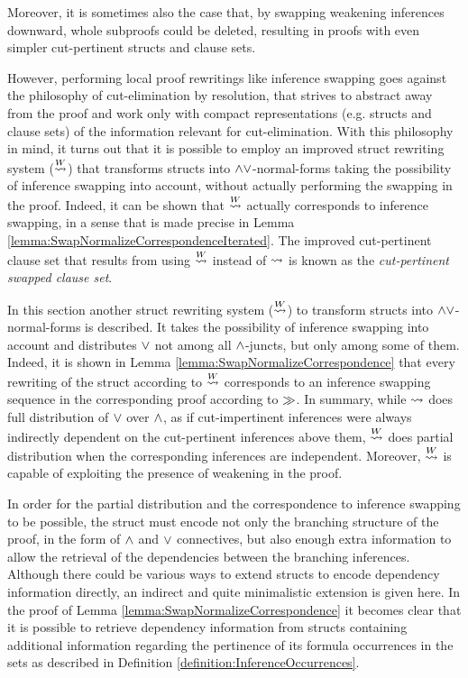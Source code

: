\documentclass{llncs}
\begin{document}
Moreover, it is sometimes also the case that, by swapping weakening inferences downward, whole subproofs could be deleted, resulting in proofs with even simpler cut-pertinent structs and clause sets.

However, performing local proof rewritings like inference swapping goes against the philosophy of cut-elimination by resolution, that strives to abstract away from the proof and work only with compact representations (e.g. structs and clause sets) of the information relevant for cut-elimination. With this philosophy in mind, it turns out that it is possible to employ an improved struct rewriting system ($\stackrel{W}{\leadsto}$) that transforms structs into $\wedge\vee$-normal-forms taking the possibility of inference swapping into account, without actually performing the swapping in the proof. Indeed, it can be shown that $\stackrel{W}{\leadsto}$ actually corresponds to inference swapping, in a sense that is made precise in Lemma \ref{lemma:SwapNormalizeCorrespondenceIterated}. The improved cut-pertinent clause set that results from using $\stackrel{W}{\leadsto}$ instead of $\leadsto$ is known as the \emph{cut-pertinent swapped clause set}.



In this section another struct rewriting system ($\stackrel{W}{\leadsto}$) to transform structs into $\wedge\vee$-normal-forms is described. It takes the possibility of inference swapping into account and distributes $\vee$ not among all $\wedge$-juncts, but only among some of them. Indeed, it is shown in Lemma \ref{lemma:SwapNormalizeCorrespondence} that every rewriting of the struct according to $\stackrel{W}{\leadsto}$ corresponds to an inference swapping sequence in the corresponding proof according to $\gg$. In summary, while $\leadsto$ does full distribution of $\vee$ over $\wedge$, as if cut-impertinent inferences were always indirectly dependent on the cut-pertinent inferences above them, $\stackrel{W}{\leadsto}$ does partial distribution when the corresponding inferences are independent. Moreover, $\stackrel{W}{\leadsto}$ is capable of exploiting the presence of weakening in the proof.

In order for the partial distribution and the correspondence to inference swapping to be possible, the struct must encode not only the branching structure of the proof, in the form of $\wedge$ and $\vee$ connectives, but also enough extra information to allow the retrieval of the dependencies between the branching inferences. Although there could be various ways to extend structs to encode dependency information directly, an indirect and quite minimalistic extension is given here. In the proof of Lemma \ref{lemma:SwapNormalizeCorrespondence} it becomes clear that it is possible to retrieve dependency information from structs containing additional information regarding the pertinence of its formula occurrences in the sets as described in Definition \ref{definition:InferenceOccurrences}.
\end{document}
